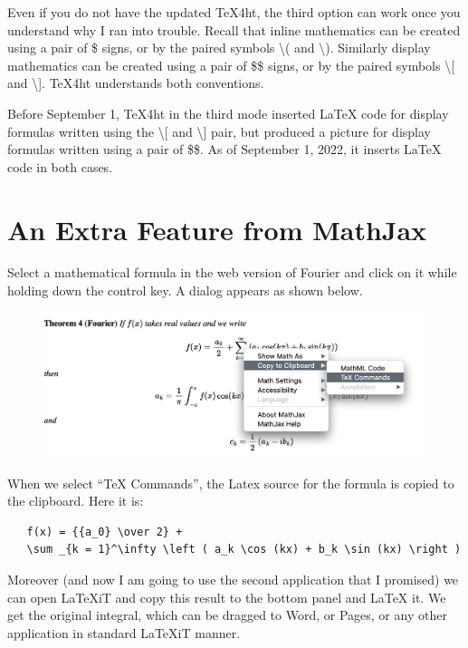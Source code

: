 \documentclass[11pt, oneside]{article}   	%
\begin{document}
Even if you do not have the updated TeX4ht, the third option can work once you understand why I ran into trouble. Recall that inline mathematics can be created using a pair of \$ signs, or by the paired symbols \textbackslash ( and \textbackslash ). 
Similarly display mathematics can be created using a pair of \$\$ signs, or by the paired symbols  \textbackslash [ and \textbackslash ]. TeX4ht  understands both conventions. 

Before September 1, TeX4ht in the third mode  inserted LaTeX code for display formulas written using the \textbackslash [ and \textbackslash ] pair, but produced a picture for display formulas written using a pair of \$\$. As of September 1, 2022, it inserts LaTeX code in both cases.

\section{An Extra Feature from MathJax}

Select a mathematical formula in the web version of Fourier and click on it while holding down the control key.
A dialog appears as shown below.

\begin{figure}[H] %
     \hspace{.2in}  \includegraphics[width=5.2in.]{Graphics/shot13.png} %
\end{figure}

When we select ``TeX Commands'', the Latex source for the formula is copied to the clipboard. Here it is:
\newpage
\begin{verbatim}
   f(x) = {{a_0} \over 2} + 
   \sum _{k = 1}^\infty \left ( a_k \cos (kx) + b_k \sin (kx) \right )
\end{verbatim}

Moreover (and now I am going to use the second application that I promised) we can open LaTeXiT and copy this result to the bottom panel and LaTeX it. We get the original integral, which can be dragged to Word, or Pages, or any other application in standard LaTeXiT manner.
\end{document}
